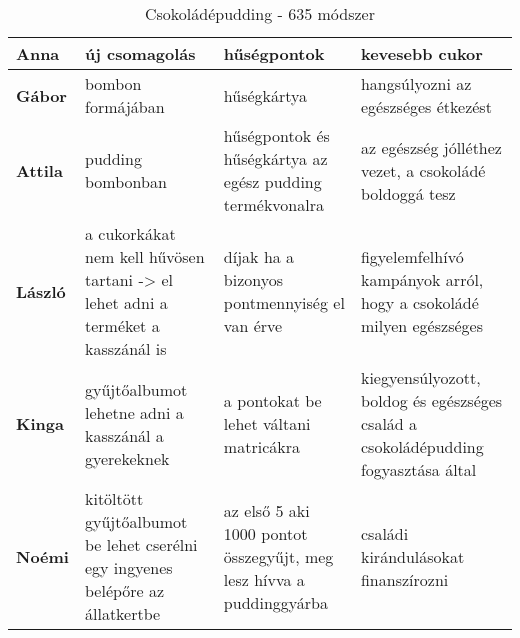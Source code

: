 \begin{table}[H]
	\begin{center}
        \caption{Csokoládépudding - 635 módszer}
        \tabcolsep=0.11cm
		\begin{tabular}{p{1cm}|p{2cm}|p{2cm}|p{5cm}}
		\textbf{Anna}   & új csomagolás 	                                                                & hűségpontok                                                           & kevesebb cukor \\
		\hline         
        \textbf{Gábor}  & bombon formájában 	                                                            & hűségkártya                                                           & hangsúlyozni az egészséges étkezést \\
        \hline         
        \textbf{Attila} & pudding bombonban       	                                                        & hűségpontok és hűségkártya az egész pudding termékvonalra             & az egészség jólléthez vezet, a csokoládé boldoggá tesz \\
        \hline         
        \textbf{László} & a cukorkákat nem kell hűvösen tartani -> el lehet adni a terméket a kasszánál is  & díjak ha a bizonyos pontmennyiség el van érve                         & figyelemfelhívó kampányok arról, hogy a csokoládé milyen egészséges \\
        \hline         
        \textbf{Kinga}  & gyűjtőalbumot lehetne adni a kasszánál a gyerekeknek       	                    & a pontokat be lehet váltani matricákra                                & kiegyensúlyozott, boldog és egészséges család a csokoládépudding fogyasztása által \\
        \hline         
        \textbf{Noémi}  & kitöltött gyűjtőalbumot be lehet cserélni egy ingyenes belépőre az állatkertbe    & az első 5 aki 1000 pontot összegyűjt, meg lesz hívva a puddinggyárba  & családi kirándulásokat finanszírozni \\
		\end{tabular}
	\end{center}
\end{table}